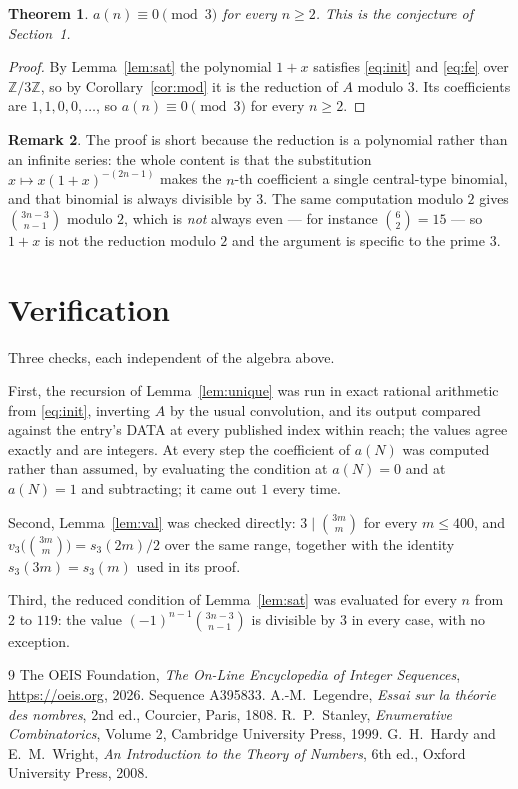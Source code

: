\documentclass[11pt,a4paper]{article}
\theoremstyle{plain}
\newtheorem{theorem}{Theorem}
\theoremstyle{definition}
\newtheorem{remark}[theorem]{Remark}
\begin{document}
\begin{theorem}
$a(n)\equiv0\pmod3$ for every $n\ge2$. This is the conjecture of Section~1.
\end{theorem}

\begin{proof}
By Lemma~\ref{lem:sat} the polynomial $1+x$ satisfies \eqref{eq:init} and \eqref{eq:fe}
over $\mathbb{Z}/3\mathbb{Z}$, so by Corollary~\ref{cor:mod} it is the reduction of $A$
modulo $3$. Its coefficients are $1,1,0,0,\dots$, so $a(n)\equiv0\pmod3$ for every $n\ge2$.
\end{proof}

\begin{remark}
The proof is short because the reduction is a polynomial rather than an infinite series:
the whole content is that the substitution $x\mapsto x(1+x)^{-(2n-1)}$ makes the $n$-th
coefficient a single central-type binomial, and that binomial is always divisible by $3$.
The same computation modulo $2$ gives $\binom{3n-3}{n-1}$ modulo $2$, which is
\emph{not} always even --- for instance $\binom{6}{2}=15$ --- so $1+x$ is not the
reduction modulo $2$ and the argument is specific to the prime $3$.
\end{remark}

\section{Verification}

Three checks, each independent of the algebra above.

First, the recursion of Lemma~\ref{lem:unique} was run in exact rational arithmetic from
\eqref{eq:init}, inverting $A$ by the usual convolution, and its output compared against
the entry's DATA at every published index within reach; the values agree exactly and are
integers. At every step the coefficient of $a(N)$ was computed rather than assumed, by
evaluating the condition at $a(N)=0$ and at $a(N)=1$ and subtracting; it came out $1$ every
time.

Second, Lemma~\ref{lem:val} was checked directly: $3\mid\binom{3m}{m}$ for every
$m\le400$, and $v_3\bigl(\binom{3m}{m}\bigr)=s_3(2m)/2$ over the same range, together
with the identity $s_3(3m)=s_3(m)$ used in its proof.

Third, the reduced condition of Lemma~\ref{lem:sat} was evaluated for every $n$ from $2$
to $119$: the value $(-1)^{n-1}\binom{3n-3}{n-1}$ is divisible by $3$ in every case,
with no exception.

\begin{thebibliography}{9}
 The OEIS Foundation, \emph{The On-Line Encyclopedia of Integer
Sequences}, \url{https://oeis.org}, 2026. Sequence A395833.
 A.-M.~Legendre, \emph{Essai sur la th\'eorie des nombres}, 2nd ed.,
Courcier, Paris, 1808.
 R.~P.~Stanley, \emph{Enumerative Combinatorics}, Volume 2, Cambridge
University Press, 1999.
 G.~H.~Hardy and E.~M.~Wright, \emph{An Introduction to the Theory of
Numbers}, 6th ed., Oxford University Press, 2008.
\end{thebibliography}
\end{document}
